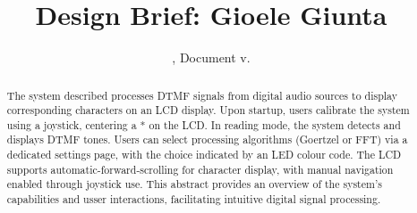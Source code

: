 \documentclass{cce2014-design}
\title{Design Brief: Gioele Giunta}
\date{\svnMaxToday, Document v.\svnInfoMaxRevision}
\begin{document}
\maketitle

\begin{abstract}
	The system described processes DTMF signals from
	digital audio sources
	to display corresponding characters on an LCD display. Upon startup,
	users
	calibrate the system using a joystick, centering a * on
	the LCD.
	In reading mode, the system detects and displays DTMF tones. Users can
	select
	processing algorithms (Goertzel or FFT) via a dedicated settings page,
	with the
	choice indicated by an LED colour code. The LCD supports
	automatic-forward-scrolling for character display, with manual
	navigation
	enabled through joystick use. This abstract provides an overview of the
	system's capabilities and usser interactions, facilitating intuitive
	digital
	signal processing.
\end{abstract}
\end{document}
